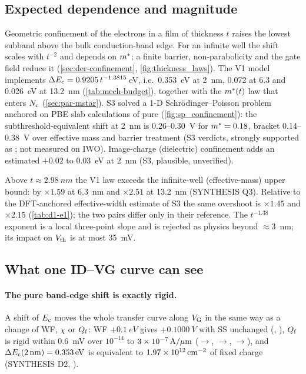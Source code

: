 \subsection{Expected dependence and magnitude}
Geometric confinement of the electrons in a film of thickness $t$ raises the lowest subband above the bulk conduction-band edge. For an infinite well the shift scales with $t^{-2}$ and depends on $m^{*}$; a finite barrier, non-parabolicity and the gate field reduce it (\cref{sec:der-confinement}, \cref{fig:thickness_laws}). The V1 model implements $\Delta E_{\mathrm{c}} = 0.9205\,t^{-1.3815}$\,eV, i.e.\ \SI{0.353}{eV} at \SI{2}{nm}, 0.072 at 6.3 and \SI{0.026}{eV} at \SI{13.2}{nm} (\cref{tab:mech-budget}), together with the $m^{*}(t)$ law that enters $N_{\mathrm{c}}$ (\cref{sec:par-mstar}). S3 solved a 1-D Schr\"odinger--Poisson problem anchored on PBE slab calculations of pure \InO{} (\cref{fig:sp_confinement}): the subthreshold-equivalent shift at \SI{2}{nm} is 0.26--\SI{0.30}{V} for $m^{*} = 0.18$, bracket 0.14--\SI{0.38}{V} over effective mass and barrier treatment (S3 verdicts, strongly supported as \evTHEORY; not measured on IWO). Image-charge (dielectric) confinement adds an estimated $+0.02$ to \SI{0.03}{eV} at \SI{2}{nm} (S3, plausible, unverified).

Above $t \approx \SI{2.98}{nm}$ the V1 law exceeds the infinite-well (effective-mass) upper bound: by $\times 1.59$ at \SI{6.3}{nm} and $\times 2.51$ at \SI{13.2}{nm} (SYNTHESIS Q3). Relative to the DFT-anchored effective-width estimate of S3 the same overshoot is $\times1.45$ and $\times2.15$ (\cref{tab:d1-e1}); the two pairs differ only in their reference. The $t^{-1.38}$ exponent is a local three-point slope and is rejected as physics beyond $\approx$\SI{3}{nm}; its impact on $V_{\mathrm{th}}$ is at most \SI{35}{mV}.

\subsection{What one ID--VG curve can see}
\paragraph{The pure band-edge shift is exactly rigid.} A shift of $E_{\mathrm{c}}$ moves the whole transfer curve along $V_{\mathrm{G}}$ in the same way as a change of WF, $\chi$ or $Q_{\mathrm{f}}$: WF $+\SI{0.1}{eV}$ gives $+\SI{0.1000}{V}$ with SS unchanged (, ), $Q_{\mathrm{f}}$ is rigid within \SI{0.6}{mV} over $10^{-14}$ to $3\times10^{-7}\,\mathrm{A}/\mu\mathrm{m}$ ($\rightarrow$, $\rightarrow$, $\rightarrow$), and $\Delta E_{\mathrm{c}}(2\,\mathrm{nm}) = \SI{0.353}{eV}$ is equivalent to $1.97\times10^{12}\,\mathrm{cm}^{-2}$ of fixed charge (SYNTHESIS D2, \evNUM).

